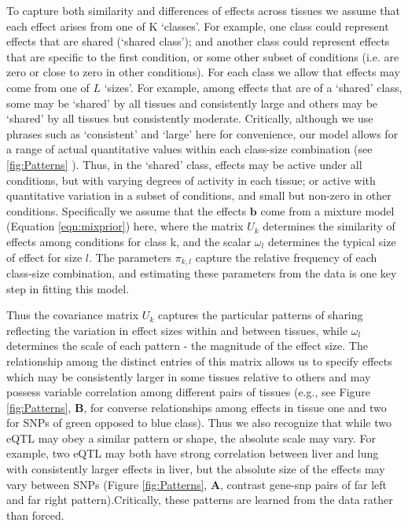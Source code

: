 To capture both similarity and differences of effects across tissues we assume that each effect arises from one of K `classes'. For example, one class could represent effects that are shared  (`shared class');
and another class could represent effects that are specific to the first condition, or some other subset of conditions (i.e. are zero or close to zero in other conditions). For each class we allow that effects may come from one of $L$ `sizes'. For example, among effects that are of a `shared' class, some may be `shared' by all tissues and consistently large and others may be `shared' by all tissues but consistently moderate.
Critically, although we use phrases such as `consistent' and `large' here for convenience, our model allows for a range of actual quantitative values within each class-size combination (see \ref{fig:Patterns}
). Thus, in the `shared' class, effects may be active under all conditions, but with varying degrees of activity in each tissue; or active with quantitative variation in a subset of conditions, and small but non-zero in other conditions. Specifically we assume that the effects $\bm{b}$ come from a mixture model (Equation \ref{eqn:mixprior}) here, where the matrix $U_{k}$  determines the similarity of effects among conditions for class k, and the scalar $\omega_{l}$ determines the typical size of effect for size $l$. The parameters $\pi_{k,l}$ capture the relative frequency of each class-size combination, and estimating these parameters from the data is one key step in fitting this model. 

Thus the covariance matrix $U_{k}$ captures the particular patterns of sharing reflecting the variation in effect sizes within and between tissues, while $\omega_{l}$ determines the scale of each pattern - the magnitude of the effect size. The relationship among the distinct entries of this matrix allows us to specify effects which may be consistently larger in some tissues relative to others and may possess variable correlation among different pairs of tissues (e.g., see Figure \ref{fig:Patterns}, \textbf{B}, for converse relationships among effects in tissue one and two for SNPs of green opposed to blue class). Thus we also recognize that while two eQTL may obey a similar pattern or shape, the absolute scale may vary. For example, two eQTL may both have strong correlation between liver and lung with consistently larger effects in liver, but the absolute size of the effects may vary between SNPs (Figure \ref{fig:Patterns}, \textbf{A}, contrast gene-snp pairs of far left and far right pattern).Critically, these patterns are learned from the data rather than forced. 

